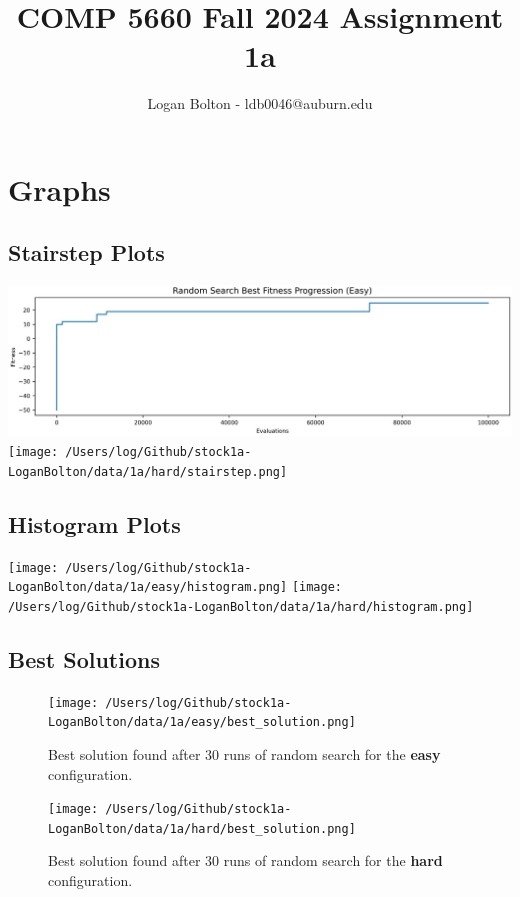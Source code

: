 \documentclass{article}
\begin{document}
\title{COMP 5660 Fall 2024 Assignment 1a}
\author{Logan Bolton - ldb0046@auburn.edu}
\date{}

\maketitle

\section{Graphs}
\subsection{Stairstep Plots}
\includegraphics[width=\textwidth]{stairstep.png}
\texttt{[image: /Users/log/Github/stock1a-LoganBolton/data/1a/hard/stairstep.png]}

\subsection{Histogram Plots}
\texttt{[image: /Users/log/Github/stock1a-LoganBolton/data/1a/easy/histogram.png]}
\texttt{[image: /Users/log/Github/stock1a-LoganBolton/data/1a/hard/histogram.png]}
\subsection{Best Solutions}

\begin{figure}[ht]
    \centering
    \texttt{[image: /Users/log/Github/stock1a-LoganBolton/data/1a/easy/best\_solution.png]}
    \caption{Best solution found after 30 runs of random search for the \textbf{easy} configuration.}
\end{figure}

\begin{figure}[ht]
    \centering
    \texttt{[image: /Users/log/Github/stock1a-LoganBolton/data/1a/hard/best\_solution.png]}
    \caption{Best solution found after 30 runs of random search for the \textbf{hard} configuration.}
\end{figure}
\end{document}
